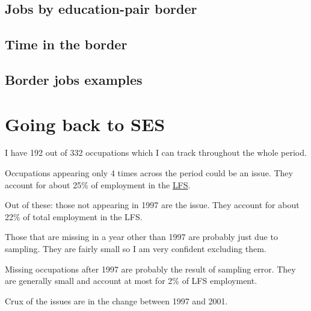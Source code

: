 \documentclass[a4paper, 12pt]{article}
\begin{document}




\subsection{Jobs by education-pair border}	




\subsection{Time in the border}




\subsection{Border jobs examples}




\section{Going back to SES}
\bitem
	\item I have 192 out of 332 occupations which I can track throughout the whole period.
	\item Occupations appearing only 4 times across the period could be an issue. They account for about 25\% of employment in the \href{https://www.dropbox.com/s/bzkjsuhid0z5yaf/sesPanelEmpshare.txt?dl=0}{LFS}.
	\bitem 
		\item Out of these: those not appearing in 1997 are the issue. They account for about 22\% of total employment in the LFS.
		\item Those that are missing in a year other than 1997 are probably just due to sampling. They are fairly small so I am very confident excluding them.
	\eitem
	\item Missing occupations after 1997 are probably the result of sampling error. They are generally small and account at most for 2\% of LFS employment.
	\item Crux of the issues are in the change between 1997 and 2001.
\eitem
\end{document}
